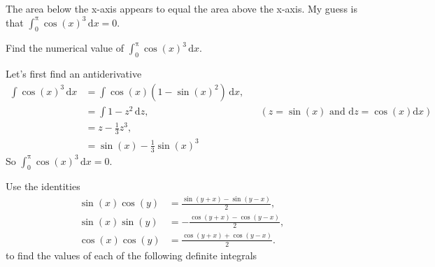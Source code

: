 \documentclass[12pt,fleqn,answers]{exam}
\begin{document}
\begin{questions}
\begin{solution}
The area below the x-axis appears to equal the area above the x-axis. My guess is that $\int_0^\uppi \cos(x)^3 \, \mathrm{d} x = 0$.
\end{solution}

\newpage
\question [2] Find the numerical value of $\int_0^\uppi \cos(x)^3 \, \mathrm{d} x$.
\begin{solution}[2.5in] Let's first find an antiderivative
\begin{align*}
  \int \cos(x)^3 \, \mathrm{d} x &= \int \cos(x) (1-\sin(x)^2) \, \mathrm{d} x, \\
                                                                          &= \int 1-z^2 \, \mathrm{d} z,  && (z = \sin(x) \text{  and  } \mathrm{d} z = \cos(x) \mathrm{d} x)\\
                                                                          &= z - \frac{1}{3} z^3, \\
                                                                          &= \sin(x) -  \frac{1}{3} \sin(x)^3
\end{align*}
So $\int_0^\uppi \cos(x)^3 \, \mathrm{d} x  = 0$.
\end{solution}

\newpage 
\question [3] Use the identities
\begin{align*}
    \sin{(x)} \cos{(y)} &= \frac{\sin{\left( y+x\right) }-\sin{\left( y-x\right) }}{2}, \\
    \sin{(x)} \sin{(y)} &=  -\frac{\cos{\left( y+x\right) }-\cos{\left( y-x\right) }}{2}, \\
    \cos{(x)} \cos{(y)} &= \frac{\cos{\left( y+x\right) }+\cos{\left( y-x\right) }}{2}.    
\end{align*}
to find the values of each of the following definite integrals

\end{questions}
\end{document}
